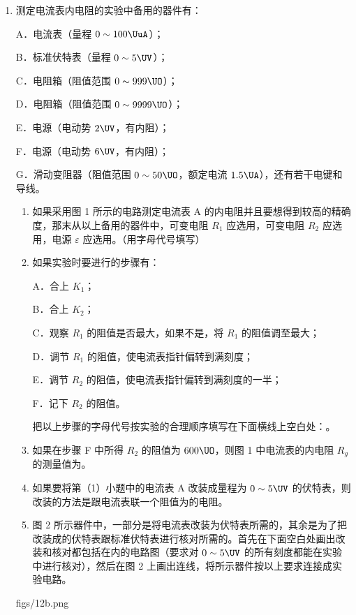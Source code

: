 \documentclass[\gkver]{gaokaozhenti}
\begin{document}
\begin{enumerate}
\item
测定电流表内电阻的实验中备用的器件有：

A．电流表（量程 $0\sim100\UuA$）；

B．标准伏特表（量程 $0\sim5\UV$）；

C．电阻箱（阻值范围 $0\sim999\UO$）；

D．电阻箱（阻值范围 $0\sim9999\UO$）；

E．电源（电动势 $2\UV$，有内阻）；

F．电源（电动势 $6\UV$，有内阻）；

G．滑动变阻器（阻值范围 $0\sim50\UO$，额定电流 $1.5\UA$），还有若干电键和导线。
\begin{enumerate}
	\item
	如果采用图 1 所示的电路测定电流表 A 的内电阻并且要想得到较高的精确度，那末从以上备用的器件中，可变电阻 $R_{1}$ 应选用，可变电阻 $R_{2}$ 应选用，电源 $\varepsilon$ 应选用。（用字母代号填写）
	\item
	如果实验时要进行的步骤有：

	A．合上 $K_{1}$；

	B．合上 $K_{2}$；

	C．观察 $R_{1}$ 的阻值是否最大，如果不是，将 $R_{1}$ 的阻值调至最大；

	D．调节 $R_{1}$ 的阻值，使电流表指针偏转到满刻度；

	E．调节 $R_{2}$ 的阻值，使电流表指针偏转到满刻度的一半；

	F．记下 $R_{2}$ 的阻值。

	把以上步骤的字母代号按实验的合理顺序填写在下面横线上空白处：。
	\item
	如果在步骤 F 中所得 $R_{2}$ 的阻值为 $600\UO$，则图 1 中电流表的内电阻 $R_{g}$ 的测量值为\tkanswer{$600\UO$}。
	\item
	如果要将第（1）小题中的电流表 A 改装成量程为 $0\sim5\UV$ 的伏特表，则改装的方法是跟电流表联一个阻值为\tkanswer{$49400\UO$}的电阻。
	\item
	图 2 所示器件中，一部分是将电流表改装为伏特表所需的，其余是为了把改装成的伏特表跟标准伏特表进行核对所需的。首先在下面空白处画出改装和核对都包括在内的电路图（要求对 $0\sim5\UV$ 的所有刻度都能在实验中进行核对），然后在图 2 上画出连线，将所示器件按以上要求连接成实验电路。
\end{enumerate}
{figs/12b.png}
\end{enumerate}
\end{document}
